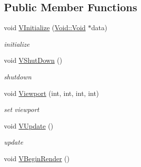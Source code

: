 \subsection*{Public Member Functions}
\begin{DoxyCompactItemize}
\item 
\hypertarget{classPlatform_1_1Renderer_1_1RendererGLX_a479bd61df5e5e4504bf0f871e3d2793b}{
void \hyperlink{classPlatform_1_1Renderer_1_1RendererGLX_a479bd61df5e5e4504bf0f871e3d2793b}{VInitialize} (\hyperlink{structVoid_1_1Void}{Void::Void} $\ast$data)}
\label{classPlatform_1_1Renderer_1_1RendererGLX_a479bd61df5e5e4504bf0f871e3d2793b}

\begin{DoxyCompactList}\small\item\em initialize \item\end{DoxyCompactList}\item 
\hypertarget{classPlatform_1_1Renderer_1_1RendererGLX_a1a928c595d0c20a469e3671ed98a1a88}{
void \hyperlink{classPlatform_1_1Renderer_1_1RendererGLX_a1a928c595d0c20a469e3671ed98a1a88}{VShutDown} ()}
\label{classPlatform_1_1Renderer_1_1RendererGLX_a1a928c595d0c20a469e3671ed98a1a88}

\begin{DoxyCompactList}\small\item\em shutdown \item\end{DoxyCompactList}\item 
\hypertarget{classPlatform_1_1Renderer_1_1RendererGLX_aaff44f16ae7103ba9dfbc02c43bcb46c}{
void \hyperlink{classPlatform_1_1Renderer_1_1RendererGLX_aaff44f16ae7103ba9dfbc02c43bcb46c}{Viewport} (int, int, int, int)}
\label{classPlatform_1_1Renderer_1_1RendererGLX_aaff44f16ae7103ba9dfbc02c43bcb46c}

\begin{DoxyCompactList}\small\item\em set viewport \item\end{DoxyCompactList}\item 
\hypertarget{classPlatform_1_1Renderer_1_1RendererGLX_ae95127a6f3a35db8f628a4bc4aa2cc76}{
void \hyperlink{classPlatform_1_1Renderer_1_1RendererGLX_ae95127a6f3a35db8f628a4bc4aa2cc76}{VUpdate} ()}
\label{classPlatform_1_1Renderer_1_1RendererGLX_ae95127a6f3a35db8f628a4bc4aa2cc76}

\begin{DoxyCompactList}\small\item\em update \item\end{DoxyCompactList}\item 
\hypertarget{classPlatform_1_1Renderer_1_1RendererGLX_a17751dbc182e7a111e607398c6720e34}{
void \hyperlink{classPlatform_1_1Renderer_1_1RendererGLX_a17751dbc182e7a111e607398c6720e34}{VBeginRender} ()}
\label{classPlatform_1_1Renderer_1_1RendererGLX_a17751dbc182e7a111e607398c6720e34}


\end{DoxyCompactItemize}
